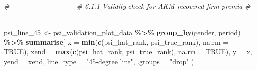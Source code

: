 \documentclass[
]{article}
\newenvironment{Shaded}{\begin{snugshade}}{\end{snugshade}}
\newcommand{\AttributeTok}[1]{\textcolor[rgb]{0.13,0.29,0.53}{#1}}
\newcommand{\CommentTok}[1]{\textcolor[rgb]{0.56,0.35,0.01}{\textit{#1}}}
\newcommand{\ConstantTok}[1]{\textcolor[rgb]{0.56,0.35,0.01}{#1}}
\newcommand{\FunctionTok}[1]{\textcolor[rgb]{0.13,0.29,0.53}{\textbf{#1}}}
\newcommand{\NormalTok}[1]{#1}
\newcommand{\OtherTok}[1]{\textcolor[rgb]{0.56,0.35,0.01}{#1}}
\newcommand{\SpecialCharTok}[1]{\textcolor[rgb]{0.81,0.36,0.00}{\textbf{#1}}}
\newcommand{\StringTok}[1]{\textcolor[rgb]{0.31,0.60,0.02}{#1}}
\begin{document}
\begin{Shaded}
\begin{Highlighting}[]
\CommentTok{\#{-}{-}{-}{-}{-}{-}{-}{-}{-}{-}{-}{-}{-}{-}{-}{-}{-}{-}{-}{-}{-}{-}{-}{-}{-}{-}}
\CommentTok{\# 6.1.1 Validity check for AKM{-}recovered firm premia}
\CommentTok{\#{-}{-}{-}{-}{-}{-}{-}{-}{-}{-}{-}{-}{-}{-}{-}{-}{-}{-}{-}{-}{-}{-}{-}{-}{-}{-}}

\NormalTok{psi\_line\_45 }\OtherTok{\textless{}{-}}\NormalTok{ psi\_validation\_plot\_data }\SpecialCharTok{\%\textgreater{}\%}
    \FunctionTok{group\_by}\NormalTok{(gender, period) }\SpecialCharTok{\%\textgreater{}\%}
    \FunctionTok{summarise}\NormalTok{(}
        \AttributeTok{x =} \FunctionTok{min}\NormalTok{(}\FunctionTok{c}\NormalTok{(psi\_hat\_rank, psi\_true\_rank), }\AttributeTok{na.rm =} \ConstantTok{TRUE}\NormalTok{),}
        \AttributeTok{xend =} \FunctionTok{max}\NormalTok{(}\FunctionTok{c}\NormalTok{(psi\_hat\_rank, psi\_true\_rank), }\AttributeTok{na.rm =} \ConstantTok{TRUE}\NormalTok{),}
        \AttributeTok{y =}\NormalTok{ x,}
        \AttributeTok{yend =}\NormalTok{ xend,}
        \AttributeTok{line\_type =} \StringTok{"45{-}degree line"}\NormalTok{,}
        \AttributeTok{.groups =} \StringTok{"drop"}
\NormalTok{    )}


\end{Highlighting}
\end{Shaded}
\end{document}
